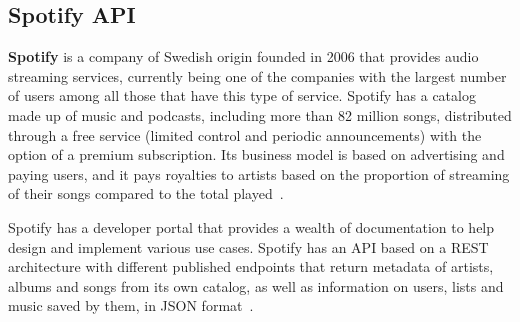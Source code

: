 \subsection{Spotify API}
\nonzeroparskip \textbf{Spotify} is a company of Swedish origin founded in 2006 that provides audio streaming services, currently being one of the companies with the largest number of users among all those that have this type of service. Spotify has a catalog made up of music and podcasts, including more than 82 million songs, distributed through a free service (limited control and periodic announcements) with the option of a premium subscription. Its business model is based on advertising and paying users, and it pays royalties to artists based on the proportion of streaming of their songs compared to the total played~\cite{wikipedia_spotify}.

\nonzeroparskip Spotify has a developer portal that provides a wealth of documentation to help design and implement various use cases. Spotify has an API based on a REST architecture with different published endpoints that return metadata of artists, albums and songs from its own catalog, as well as information on users, lists and music saved by them, in JSON format~\cite{spotify_dev}.

